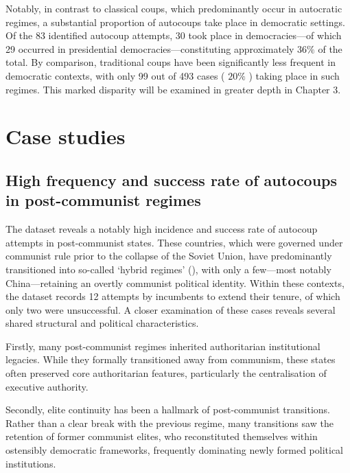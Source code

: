 \documentclass[
  12pt,
]{report}
\begin{document}
Notably, in contrast to classical coups, which predominantly occur in
autocratic regimes, a substantial proportion of autocoups take place in
democratic settings. Of the 83 identified autocoup attempts, 30 took
place in democracies---of which 29 occurred in presidential
democracies---constituting approximately \(36\%\) of the total. By
comparison, traditional coups have been significantly less frequent in
democratic contexts, with only 99 out of 493 cases ( \(20\%\) ) taking
place in such regimes. This marked disparity will be examined in greater
depth in Chapter 3.

\section{Case studies}\label{case-studies}

\subsection*{High frequency and success rate of autocoups in
post-communist
regimes}\label{high-frequency-and-success-rate-of-autocoups-in-post-communist-regimes}

The dataset reveals a notably high incidence and success rate of
autocoup attempts in post-communist states. These countries, which were
governed under communist rule prior to the collapse of the Soviet Union,
have predominantly transitioned into so-called `hybrid regimes'
(), with only a
few---most notably China---retaining an overtly communist political
identity. Within these contexts, the dataset records 12 attempts by
incumbents to extend their tenure, of which only two were unsuccessful.
A closer examination of these cases reveals several shared structural
and political characteristics.

Firstly, many post-communist regimes inherited authoritarian
institutional legacies. While they formally transitioned away from
communism, these states often preserved core authoritarian features,
particularly the centralisation of executive authority.

Secondly, elite continuity has been a hallmark of post-communist
transitions. Rather than a clear break with the previous regime, many
transitions saw the retention of former communist elites, who
reconstituted themselves within ostensibly democratic frameworks,
frequently dominating newly formed political institutions.
\end{document}

